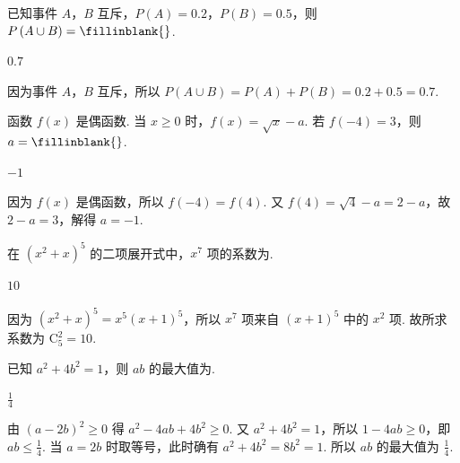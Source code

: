 \documentclass[UTF8,a4paper,oneside,11pt]{ctexbook}
\begin{document}
\begin{problem}
已知事件 \(A\)，\(B\) 互斥，\( P\left( A \right)=0.2 \)，\( P\left( B \right)=0.5 \)，则 \( P\left( A\cup B \right)=\fillinblank{} \).
\end{problem}

\begin{answer}
\(0.7\)
\end{answer}

\begin{solution}
因为事件 \(A\)，\(B\) 互斥，所以 \( P\left( A\cup B \right)=P\left( A \right)+P\left( B \right)=0.2+0.5=0.7 \).
\end{solution}

\begin{problem}
函数 \( f(x) \) 是偶函数. 当 \( x\ge 0 \) 时，\( f(x)=\sqrt{x}-a \). 若 \( f(-4)=3 \)，则 \( a=\fillinblank{} \).
\end{problem}

\begin{answer}
\(-1\)
\end{answer}

\begin{solution}
因为 \( f(x) \) 是偶函数，所以 \( f(-4)=f(4) \). 又 \( f(4)=\sqrt{4}-a=2-a \)，故 \( 2-a=3 \)，解得 \( a=-1 \).
\end{solution}

\begin{problem}
在 \( \left( x^2+x \right)^5 \) 的二项展开式中，\( x^7 \) 项的系数为\fillinblank{}.
\end{problem}

\begin{answer}
\(10\)
\end{answer}

\begin{solution}
因为 \( \left( x^2+x \right)^5=x^5\left( x+1 \right)^5 \)，所以 \( x^7 \) 项来自 \( \left( x+1 \right)^5 \) 中的 \( x^2 \) 项. 故所求系数为 \( \mathrm C_5^2=10 \).
\end{solution}

\begin{problem}
已知 \( a^2+4b^2=1 \)，则 \( ab \) 的最大值为\fillinblank{}.
\end{problem}

\begin{answer}
\(\frac{1}{4}\)
\end{answer}

\begin{solution}
由 \( \left( a-2b \right)^2\ge 0 \) 得 \( a^2-4ab+4b^2\ge 0 \).
又 \( a^2+4b^2=1 \)，所以 \( 1-4ab\ge 0 \)，即 \( ab\le \frac{1}{4} \). 当 \( a=2b \) 时取等号，此时确有 \( a^2+4b^2=8b^2=1 \). 所以 \( ab \) 的最大值为 \( \frac{1}{4} \).
\end{solution}
\end{document}
